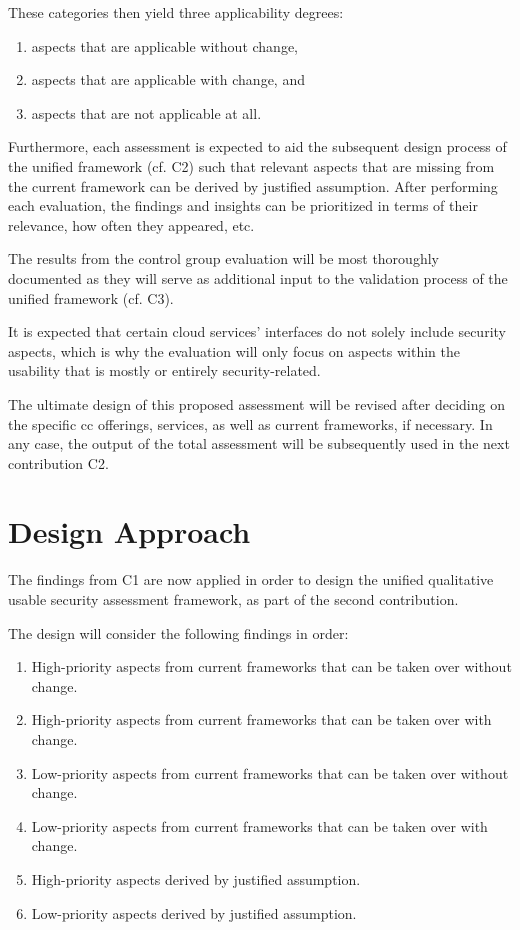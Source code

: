 These categories then yield three applicability degrees:

\begin{enumerate}
	\item aspects that are applicable without change,
	\item aspects that are applicable with change, and
	\item aspects that are not applicable at all.
\end{enumerate}

Furthermore, each assessment is expected to aid the subsequent design process of the unified framework (cf. C2) such that relevant aspects that are missing from the current framework can be derived by justified assumption. After performing each evaluation, the findings and insights can be prioritized in terms of their relevance, how often they appeared, etc.

The results from the control group evaluation will be most thoroughly documented as they will serve as additional input to the validation process of the unified framework (cf. C3).

It is expected that certain cloud services' interfaces do not solely include security aspects, which is why the evaluation will only focus on aspects within the usability that is mostly or entirely security-related.

The ultimate design of this proposed assessment will be revised after deciding on the specific \ac{cc} offerings, services, as well as current frameworks, if necessary. In any case, the output of the total assessment will be subsequently used in the next contribution C2.

\section{Design Approach}
The findings from C1 are now applied in order to design the unified qualitative usable security assessment framework, as part of the second contribution.

The design will consider the following findings in order:

\begin{enumerate}
	\item High-priority aspects from current frameworks that can be taken over without change.
	\item High-priority aspects from current frameworks that can be taken over with change.
	\item Low-priority aspects from current frameworks that can be taken over without change.
	\item Low-priority aspects from current frameworks that can be taken over with change.
	\item High-priority aspects derived by justified assumption.
	\item Low-priority aspects derived by justified assumption.
\end{enumerate}

